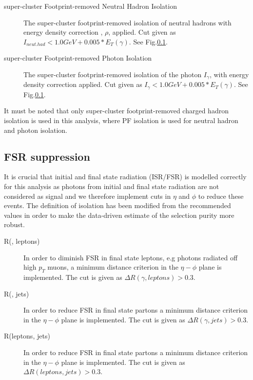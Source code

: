 \begin{description}
\item[super-cluster Footprint-removed Neutral Hadron Isolation] The super-cluster footprint-removed isolation of neutral hadrons with energy density correction , $\rho$, applied.
Cut given as $I_{neut.had} < 1.0 GeV + 0.005*E_T(\gamma)$. See Fig.\ref{}.

\item[super-cluster Footprint-removed Photon Isolation] The super-cluster footprint-removed isolation of the photon $I_{\gamma}$, with energy density correction applied. Cut given
as $I_{\gamma} < 1.0 GeV + 0.005*E_T(\gamma)$. See Fig.\ref{}. 

\end{description}

It must be noted that only super-cluster footprint-removed charged hadron isolation is used in this analysis, where PF isolation is used for neutral hadron and photon isolation.

\subsection{FSR suppression}

It is crucial that initial and final state radiation (ISR/FSR) is modelled correctly for this analysis as photons from initial and final state radiation are not considered as signal and we therefore implement cuts in $\eta$ and $\phi$ to reduce these events. The definition of isolation has been modified from the recommended values in order to make the data-driven estimate of the selection purity more robust.

\begin{description}
\item[\Delta R(\gamma, leptons)] In order to diminish FSR in final state leptons, e.g photons radiated off high $p_T$ muons, a minimum distance criterion in the $\eta - \phi$ plane is implemented. The cut is given as $\Delta R(\gamma, leptons) > 0.3$.

\item[\Delta R(\gamma, jets)] In order to reduce FSR in final state partons a minimum distance criterion in the $\eta - \phi$ plane is implemented. The cut is given as $\Delta R(\gamma, jets) > 0.3$.

\item[\Delta R(leptons, jets)] In order to reduce FSR in final state partons a minimum distance criterion in the $\eta - \phi$ plane is implemented. The cut is given as $\Delta R(leptons, jets) > 0.3$.
\end{description}

